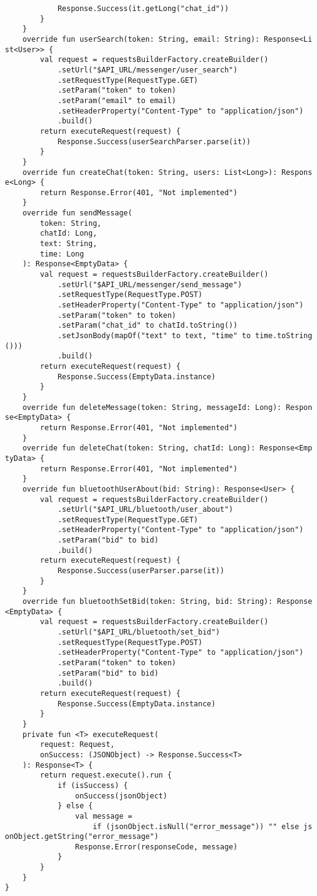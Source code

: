 \documentclass[listing]{espd}
\begin{document}
\begin{verbatim}
            Response.Success(it.getLong("chat_id"))
        }
    }
    override fun userSearch(token: String, email: String): Response<Li
st<User>> {
        val request = requestsBuilderFactory.createBuilder()
            .setUrl("$API_URL/messenger/user_search")
            .setRequestType(RequestType.GET)
            .setParam("token" to token)
            .setParam("email" to email)
            .setHeaderProperty("Content-Type" to "application/json")
            .build()
        return executeRequest(request) {
            Response.Success(userSearchParser.parse(it))
        }
    }
    override fun createChat(token: String, users: List<Long>): Respons
e<Long> {
        return Response.Error(401, "Not implemented")
    }
    override fun sendMessage(
        token: String,
        chatId: Long,
        text: String,
        time: Long
    ): Response<EmptyData> {
        val request = requestsBuilderFactory.createBuilder()
            .setUrl("$API_URL/messenger/send_message")
            .setRequestType(RequestType.POST)
            .setHeaderProperty("Content-Type" to "application/json")
            .setParam("token" to token)
            .setParam("chat_id" to chatId.toString())
            .setJsonBody(mapOf("text" to text, "time" to time.toString
()))
            .build()
        return executeRequest(request) {
            Response.Success(EmptyData.instance)
        }
    }
    override fun deleteMessage(token: String, messageId: Long): Respon
se<EmptyData> {
        return Response.Error(401, "Not implemented")
    }
    override fun deleteChat(token: String, chatId: Long): Response<Emp
tyData> {
        return Response.Error(401, "Not implemented")
    }
    override fun bluetoothUserAbout(bid: String): Response<User> {
        val request = requestsBuilderFactory.createBuilder()
            .setUrl("$API_URL/bluetooth/user_about")
            .setRequestType(RequestType.GET)
            .setHeaderProperty("Content-Type" to "application/json")
            .setParam("bid" to bid)
            .build()
        return executeRequest(request) {
            Response.Success(userParser.parse(it))
        }
    }
    override fun bluetoothSetBid(token: String, bid: String): Response
<EmptyData> {
        val request = requestsBuilderFactory.createBuilder()
            .setUrl("$API_URL/bluetooth/set_bid")
            .setRequestType(RequestType.POST)
            .setHeaderProperty("Content-Type" to "application/json")
            .setParam("token" to token)
            .setParam("bid" to bid)
            .build()
        return executeRequest(request) {
            Response.Success(EmptyData.instance)
        }
    }
    private fun <T> executeRequest(
        request: Request,
        onSuccess: (JSONObject) -> Response.Success<T>
    ): Response<T> {
        return request.execute().run {
            if (isSuccess) {
                onSuccess(jsonObject)
            } else {
                val message =
                    if (jsonObject.isNull("error_message")) "" else js
onObject.getString("error_message")
                Response.Error(responseCode, message)
            }
        }
    }
}
\end{verbatim}
\end{document}
